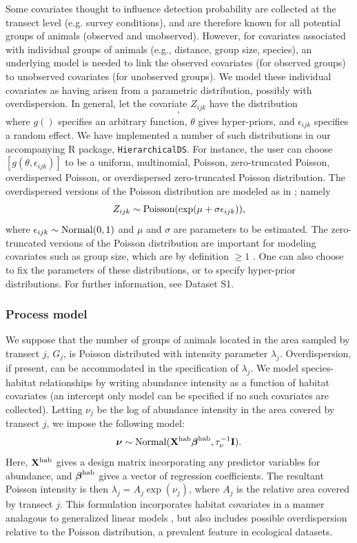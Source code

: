 \documentclass[10pt]{article}
\begin{document}
Some covariates thought to influence detection probability are collected at the transect level (e.g. survey conditions), and are therefore known for all potential groups of animals (observed and unobserved).  However, for covariates associated with individual groups of animals (e.g., distance, group size, species), an underlying model is needed to link the observed covariates (for observed groups) to unobserved covariates (for unobserved groups).  We model these individual covariates as having arisen from a parametric distribution, possibly with overdispersion.  In general, let the covariate $Z_{ijk}$ have the distribution
\begin{equation}
[g(\theta,\epsilon_{ijk})],
\label{eq:cov.dist}
\end{equation}
where $g()$ specifies an arbitrary function, $\theta$ gives hyper-priors, and $\epsilon_{ijk}$ specifies a random effect.  We have implemented a number of such distributions in our accompanying R package, {\tt HierarchicalDS}.  For instance, the user can choose $[g(\theta,\epsilon_{ijk})]$ to be a uniform, multinomial, Poisson, zero-truncated Poisson, overdispersed Poisson, or overdispersed zero-truncated Poisson distribution.  The overdispersed versions of the Poisson distribution are modeled as in \cite{McClintockEtAl2009}; namely
$$
Z_{ijk} \sim {\rm Poisson}(\exp(\mu+\sigma \epsilon_{ijk})),
$$
where $\epsilon_{ijk} \sim {\rm Normal}(0,1)$ and $\mu$ and $\sigma$ are parameters to be estimated.
The zero-truncated versions of the Poisson distribution are important for modeling covariates such as group size, which are by definition $\ge 1$ \cite{Royle2008}.
One can also choose to fix the parameters of these distributions, or to specify hyper-prior distributions.  For further information, see Dataset S1.

\subsubsection*{Process model}

We suppose that the number of groups of animals located in the area sampled by transect $j$, $G_j$, is Poisson distributed with intensity parameter $\lambda_j$.  Overdispersion, if present, can be accommodated in the specification of $\lambda_j$.
We model species-habitat relationships by writing abundance intensity as a function of habitat covariates (an intercept only model can be specified if no such covariates are collected).  Letting $\nu_j$ be the log of abundance intensity in the area covered by transect $j$, we impose the following model:
$$
 \boldsymbol{\nu} \sim {\rm Normal}({\bf X}^{\rm hab}
 \boldsymbol{\beta}^{\rm hab},\tau_\nu^{-1}{\bf I}).
$$
Here, ${\bf X}^{\rm hab}$ gives a design matrix incorporating any predictor variables for abundance, and $\boldsymbol{\beta}^{\rm hab}$ gives a vector of regression coefficients.
The resultant Poisson intensity is then $\lambda_j=A_j \exp(\nu_j)$, where $A_j$ is the relative area covered by transect $j$.  This formulation incorporates habitat covariates in a manner analagous to generalized linear models \cite{McCullaghNelder1989}, but also includes possible overdispersion relative to the Poisson distribution, a prevalent feature in ecological datasets.
\end{document}
